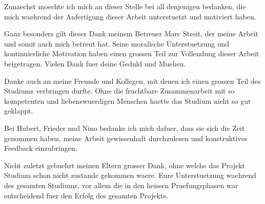 \vspace{0.5cm}

Zunaechst moechte ich mich an dieser Stelle bei all denjenigen bedanken, die mich waehrend der Anfertigung dieser Arbeit unterstuetzt und motiviert haben.

Ganz besonders gilt dieser Dank meinem Betreuer Marc Streit, der meine Arbeit und somit auch mich betreut hat. Seine moralische Unterstuetzung und kontinuierliche Motivation haben einen grossen Teil zur Vollendung dieser Arbeit beigetragen. Vielen Dank fuer deine Geduld und Muehen.

Danke auch an meine Freunde und Kollegen, mit denen ich einen grossen Teil des Studiums verbringen durfte. Ohne die fruchtbare Zusammenarbeit mit so kompetenten und liebenswuerdigen Menschen haette das Studium nicht so gut geklappt.

Bei Hubert, Frieder und Nino bedanke ich mich dafuer, dass sie sich die Zeit genommen haben, meine Arbeit gewissenhaft durchzulesen und konstruktives Feedback einzubringen.

Nicht zuletzt gebuehrt meinen Eltern grosser Dank, ohne welche das Projekt Studium schon nicht zustande gekommen waere. Eure Unterstuetzung waehrend des gesamten Studiums, vor allem die in den heissen Pruefungsphasen war entscheidend fuer den Erfolg des gesamten Projekts.